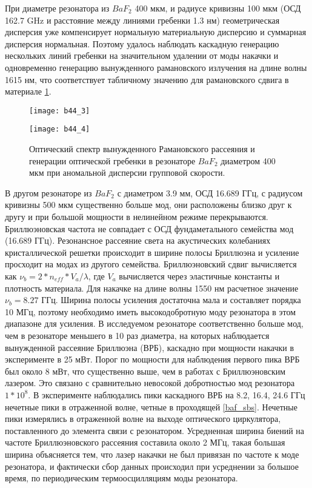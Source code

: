 При диаметре резонатора из $BaF_2$ 400 мкм, и радиусе кривизны 100 мкм (ОСД 162.7 GHz и расстояние между линиями гребенки 1.3 нм) геометрическая дисперсия уже компенсирует нормальную материальную дисперсию и суммарная дисперсия нормальная. Поэтому удалось наблюдать каскадную генерацию нескольких линий гребенки на значительном удалении от моды накачки и одновременно генерацию вынужденного рамановского излучения на длине волны 1615 нм, что соответствует табличному значению для рамановского сдвига в материале \ref{baf_comb_anomal}.
 
\begin{figure}[ht]
\begin{minipage}[ht]{0.49\linewidth}\centering
    \texttt{[image: b44\_3]}
  \end{minipage}
  \hfill
  \begin{minipage}[ht]{0.49\linewidth}\centering
    \texttt{[image: b44\_4]}
  \end{minipage}
    \caption{Оптический спектр вынужденного Рамановского рассеяния и генерации оптической гребенки в резонаторе $BaF_2$ диаметром 400 мкм при аномальной дисперсии групповой скорости.}
  \label{baf_comb_anomal}
\end{figure}

В другом резонаторе из $BaF_2$ с диаметром 3.9 мм, ОСД 16.689 ГГц, с радиусом кривизны 500 мкм существенно больше мод, они расположены близко друг к другу и при большой мощности в нелинейном режиме перекрываются. Бриллюэновская частота не совпадает с ОСД фундаметального семейства мод (16.689 ГГц). Резонансное рассеяние света на акустических колебаниях кристаллической решетки происходит в ширине полосы Бриллюэна и усиление просходит на модах из другого семейства. Бриллюэновский сдвиг вычисляется как $\nu_b=2*n_{eff}*V_a/\lambda$, где $V_a$ вычисляется через эластичные константы и плотность материала. Для накачке на длине волны 1550 нм расчетное значение $\nu_b=8.27$ ГГц. Ширина полосы усиления достаточна мала и составляет порядка 10 МГц, поэтому необходимо иметь высокодобротную моду резонатора в этом диапазоне для усиления. В исследуемом резонаторе соответственно больше мод, чем в резонаторе меньшего в 10 раз диаметра, на которых наблюдается вынужденной рассеяние Бриллюэна (ВРБ), каскадно при мощности накачки в эксперименте в 25 мВт. Порог по мощности для наблюдения первого пика ВРБ был около 8 мВт, что существенно выше, чем в работах с Бриллюэновским лазером. Это связано с сравнительно невосокой добротностью мод резонатора $1*10^8$. В эксперименте наблюдались пики каскадного ВРБ на 8.2, 16.4, 24.6 ГГц нечетные пики в отраженной волне, четные в проходящей \ref{baf_sbs}. Нечетные пики измерялись в отраженной волне на выходе оптического циркулятора, поставленного до элемента связи с резонатором. Усредненная ширина биений на частоте Бриллюэновского рассеяния составила около 2 МГц, такая большая ширина объясняется тем, что лазер накачки не был привязан по частоте к моде резонатора, и фактически сбор данных происходил при усреднении за большое время, по периодическим термоосцилляциям моды резонатора.

